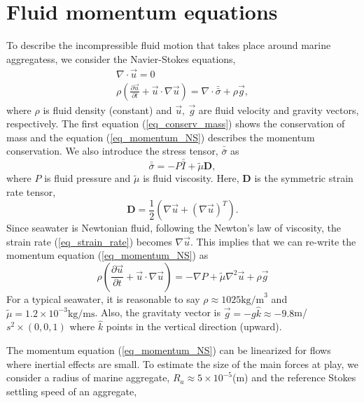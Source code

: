 \section{Fluid momentum equations}
To describe the incompressible fluid motion that takes place around marine aggregatess, we consider the Navier-Stokes equations,
\begin{align}
\nabla \cdot \vec{u} = 0 
\label{eq_conserv_mass} \\
\rho 
\left( 
   \frac{\partial \vec{u}}{\partial t} + \vec{u}\cdot \nabla \vec{u}
\right)
  = \nabla \cdot \bar{\bar{\sigma}} +  \rho  \vec{g} ,
\label{eq_momentum_NS}
\end{align}
where $ \rho$ is fluid density (constant) and $\vec{u}, \ \vec{g}$ are fluid velocity and gravity vectors, respectively.
The first equation (\ref{eq_conserv_mass}) shows the conservation of mass and the equation (\ref{eq_momentum_NS}) describes the momentum conservation. 
We also introduce the stress tensor, $\bar{\bar{\sigma}}$ as 
\begin{equation}
   \bar{\bar{\sigma}} = -P \bar{\bar{I}} + {\tilde{\mu}} {\bm D},
   \label{eq_stress_tensor}
\end{equation}
where $P$ is fluid pressure and ${\tilde{\mu}}$ is fluid viscosity. Here, ${\bm D}$ is the symmetric strain rate tensor,
\begin{equation}
   \boldsymbol{D} = \frac{1}{2} \left( \nabla \vec{u} + (\nabla  \vec{u})^T \right).
   \label{eq_strain_rate}
   \end{equation}
Since seawater is Newtonian fluid, following the Newton's law of viscosity, the strain rate (\ref{eq_strain_rate}) becomes $\nabla \vec{u}$. This implies that we can re-write the momentum equation (\ref{eq_momentum_NS}) as
\begin{equation}
  \rho \left( 
   \frac{\partial \vec{u}}{\partial t} + \vec{u}\cdot \nabla \vec{u}
\right)
  = -\nabla P  + {\tilde{\mu}} \nabla^2 \vec{u}+  \rho  \vec{g} 
  \label{eq_stokes_momentum}
\end{equation}
For a typical seawater, it is reasonable to say $\rho \approx 1025 \text{kg/m}^3$ and ${\tilde{\mu}} = 1.2 \times 10^{-3}\text{kg}/\text{ms}$.
Also, the gravitaty vector is $\vec{g} = - g\hat{k} \approx -9.8$m/$s^2 \times (0,0,1)$ where $\hat{k}$ points in the vertical direction (upward). 
\par
 The momentum equation (\ref{eq_momentum_NS}) can be linearized for flows where inertial effects are small. 
To estimate the size of the main forces at play, we consider a radius of marine aggregate, $R_a \approx 5 \times 10^{-5}$(m) and the reference Stokes settling speed of an aggregate,
